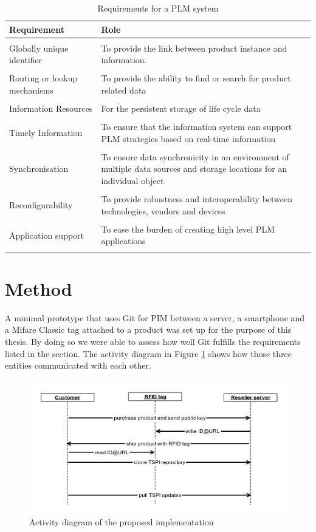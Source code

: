 \documentclass[12pt,a4paper]{article}
\begin{document}
\begin{table}[h]
\begin{tabular}{p{4cm}|p{10cm}}
Requirement & Role \\
\hline \\
Globally unique identifier & To provide the link between product instance and information. \\ \\
Routing or lookup mechanisms & To provide the ability to find or search for product related data \\ \\
Information Resources & For the persistent storage of life cycle data \\ \\
Timely Information & To ensure that the information system can support PLM strategies based on real-time information \\ \\
Synchronisation & To ensure data synchronicity in an environment of multiple data sources and storage locations for an individual object \\ \\
Reconfigurability & To provide robustness and interoperability between technologies, vendors and devices \\ \\
Application support & To ease the burden of creating high level PLM applications \\ \\
\end{tabular}
\caption{Requirements for a PLM system \citep{plcm}}
\label{tab:criterias}
\end{table}

\section{Method}
A minimal prototype that uses Git for PIM between a server, a smartphone and a Mifare Classic tag attached to a product was set up for the purpose of this thesis. By doing so we were able to assess how well Git fulfills the requirements listed in the  section. The activity diagram in Figure \ref{fig:activity} shows how those three entities communicated with each other.

\begin{figure}[h]
    \centering
    \includegraphics[scale=0.6]{images/activity.png}
    \caption{Activity diagram of the proposed implementation}
    \label{fig:activity}
\end{figure}
\end{document}
